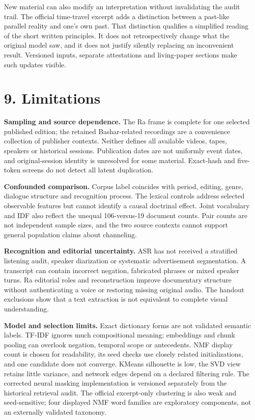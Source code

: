 \documentclass[
  11pt,
]{article}
\begin{document}
New material can also modify an interpretation without invalidating the
audit trail. The official time-travel excerpt adds a distinction between
a past-like parallel reality and one's own past. That distinction
qualifies a simplified reading of the short written principles. It does
not retrospectively change what the original model saw, and it does not
justify silently replacing an inconvenient result. Versioned inputs,
separate attestations and living-paper sections make such updates
visible.

\FloatBarrier

\section{9. Limitations}\label{limitations}

\textbf{Sampling and source dependence.} The Ra frame is complete for
one selected published edition; the retained Bashar-related recordings
are a convenience collection of publisher contexts. Neither defines all
available videos, tapes, speakers or historical sessions. Publication
dates are not uniformly event dates, and original-session identity is
unresolved for some material. Exact-hash and five-token screens do not
detect all latent duplication.

\textbf{Confounded comparison.} Corpus label coincides with period,
editing, genre, dialogue structure and recognition process. The lexical
controls address selected observable features but cannot identify a
causal doctrinal effect. Joint vocabulary and IDF also reflect the
unequal 106-versus-19 document counts. Pair counts are not independent
sample sizes, and the two source contexts cannot support general
population claims about channeling.

\textbf{Recognition and editorial uncertainty.} ASR has not received a
stratified listening audit, speaker diarization or systematic
advertisement segmentation. A transcript can contain incorrect negation,
fabricated phrases or mixed speaker turns. Ra editorial roles and
reconstruction improve documentary structure without authenticating a
voice or restoring missing original audio. The handout exclusions show
that a text extraction is not equivalent to complete visual
understanding.

\textbf{Model and selection limits.} Exact dictionary forms are not
validated semantic labels. TF-IDF ignores much compositional meaning;
embeddings and chunk pooling can overlook negation, temporal scope or
antecedents. NMF display count is chosen for readability, its seed
checks use closely related initializations, and one candidate does not
converge. KMeans silhouette is low, the SVD view retains little
variance, and network edges depend on a declared filtering rule. The
corrected neural masking implementation is versioned separately from the
historical retrieval audit. The official excerpt-only clustering is also
weak and seed-sensitive; four displayed NMF word families are
exploratory components, not an externally validated taxonomy.
\end{document}
